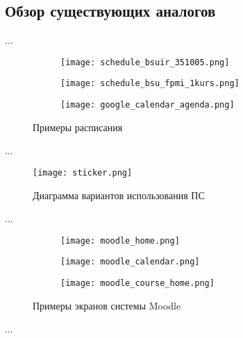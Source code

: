 \subsection{Обзор существующих аналогов}
\label{sec:analysis:analogues}

...

\begin{sidewaysfigure}
\centering
	\begin{subfigure}[b]{0.3\textwidth}
	    \centering
		\texttt{[image: schedule\_bsuir\_351005.png]} 
		\caption{}
		\label{fig:analysis:analogues:bsuir}
	\end{subfigure}
	\begin{subfigure}[b]{0.3\textwidth}
	    \centering
		\texttt{[image: schedule\_bsu\_fpmi\_1kurs.png]}
		\caption{}
		\label{fig:analysis:analogues:bsu_fpmi}
	\end{subfigure}
	\begin{subfigure}[b]{0.3\textwidth}
	    \centering
		\texttt{[image: google\_calendar\_agenda.png]} 
		\caption{}
		\label{fig:analysis:analogues:google_calendar}
	\end{subfigure}
	\caption{Примеры расписания}
\end{sidewaysfigure}

...

\begin{figure}
\centering
	\texttt{[image: sticker.png]}
	\caption{Диаграмма вариантов использования ПС}
	\label{sec:domain:horse}
\end{figure}

...

\begin{figure}
\centering
	\begin{subfigure}[ht]{0.8\textwidth}
	    \centering
		\texttt{[image: moodle\_home.png]}
		\caption{}
		\label{fig:analysis:analogues:moodle_home}
	\end{subfigure}
	\begin{subfigure}[ht]{0.8\textwidth}
	    \centering
		\texttt{[image: moodle\_calendar.png]}
		\caption{}
		\label{fig:analysis:analogues:moodle_calendar}
	\end{subfigure}
	\begin{subfigure}[ht]{0.8\textwidth}
	    \centering
		\texttt{[image: moodle\_course\_home.png]} 
		\caption{}
		\label{fig:analysis:analogues:moodle_course_home}
	\end{subfigure}
	\caption{Примеры экранов системы Moodle}
\end{figure}

...
